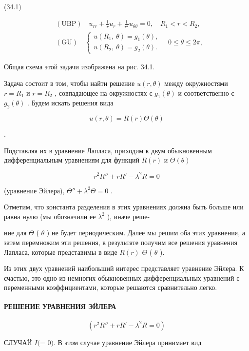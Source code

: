\documentclass[
  ukrainian,
]{article}
\begin{document}
(34.1)

\[
\begin{aligned} & (\text{UBP}) \quad u_{rr} + \frac{1}{r} u_r + \frac{1}{r^2} u_{\theta\theta} = 0, \quad R_1 < r < R_2, \\ & (\text{GU}) \quad \begin{cases} u(R_1, \ \theta) = g_1(\theta), \\ u(R_2, \ \theta) = g_2(\theta). \end{cases} \quad 0 \leqslant \theta \leqslant 2\pi, \end{aligned}
\]

Общая схема этой задачи изображена на рис. 34.1.

Задача состоит в том, чтобы найти решение \(u(r, \theta)\) между
окружностями \(r = R_1\) и \(r = R_2\) , совпадающее на окружностях с
\(g_1(\theta)\) и соответственно с \(g_2(\theta)\) . Будем искать
решения вида

\[
u(r, \theta) = R(r) \Theta(\theta)
\]

.

Подставляя их в уравнение Лапласа, приходим к двум обыкновенным
дифференциальным уравнениям для функций \(R(r)\) и \(\Theta(\theta)\)

\[
r^2R'' + rR' - \lambda^2R = 0
\]

(уравнение Эйлера), \(\Theta'' + \lambda^2\Theta = 0\) .

Отметим, что константа разделения в этих уравнениях должна быть больше
или равна нулю (мы обозначили ее \(\lambda^2\) ), иначе реше-

ние для \(\Theta\) ( \(\theta\) ) не будет периодическим. Далее мы решим
оба этих уравнения, а затем перемножим эти решения, в результате получим
все решения уравнения Лапласа, которые представимы в виде \(R (r)\)
\(\Theta\) ( \(\theta\) ).

Из этих двух уравнений наибольший интерес представляет уравнение Эйлера.
К счастью, это одно из немногих обыкновенных дифференциальных уравнений
с переменными коэффициентами, которые решаются сравнительно легко.

\paragraph{РЕШЕНИЕ УРАВНЕНИЯ
ЭЙЛЕРА}\label{ux440ux435ux448ux435ux43dux438ux435-ux443ux440ux430ux432ux43dux435ux43dux438ux44f-ux44dux439ux43bux435ux440ux430}

\[
(r^2R'' + rR' - \lambda^2R = 0)
\]

СЛУЧАЙ \(I (\)\lambda = 0\()\). В этом случае уравнение Эйлера принимает
вид
\end{document}
